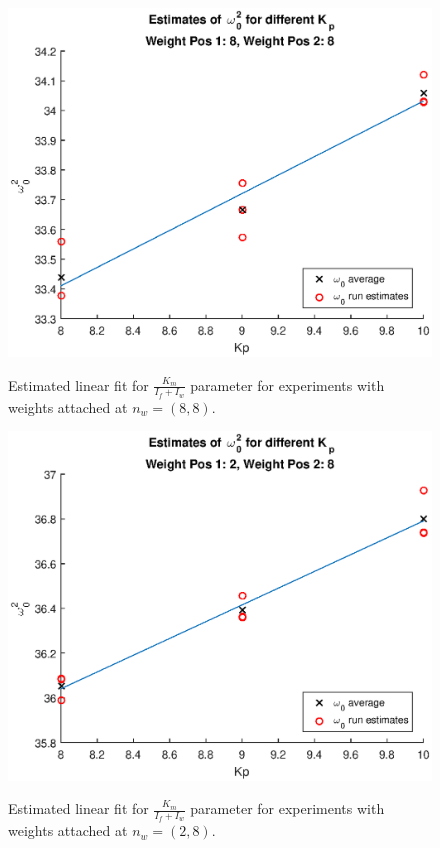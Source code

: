 \documentclass[12pt]{article}
\begin{document}
\begin{figure}[htbp]
\includegraphics[scale=1]{gfx/km_88}
\label{fig:km_88}
\caption{Estimated linear fit for $\frac{K_m}{I_f+I_w}$ parameter for experiments with weights attached at $n_w = (8,8)$.}
\end{figure}

\begin{figure}[htbp]
\includegraphics[scale=1]{gfx/km_28}
\label{fig:km_28}
\caption{Estimated linear fit for $\frac{K_m}{I_f+I_w}$ parameter for experiments with weights attached at $n_w = (2,8)$.}
\end{figure}
\end{document}
